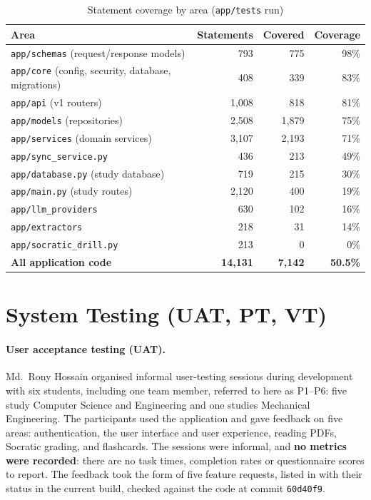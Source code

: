 \begin{table}[!htbp]
\centering
\caption{Statement coverage by area (\texttt{app/tests} run)}\label{tab:coverage}
\small
\begin{tabularx}{\textwidth}{@{}X r r r@{}}
\toprule
\textbf{Area} & \textbf{Statements} & \textbf{Covered} & \textbf{Coverage}\\
\midrule
\texttt{app/schemas} (request/response models) & 793 & 775 & 98\%\\
\texttt{app/core} (config, security, database, migrations) & 408 & 339 & 83\%\\
\texttt{app/api} (v1 routers) & 1{,}008 & 818 & 81\%\\
\texttt{app/models} (repositories) & 2{,}508 & 1{,}879 & 75\%\\
\texttt{app/services} (domain services) & 3{,}107 & 2{,}193 & 71\%\\
\texttt{app/sync\_service.py} & 436 & 213 & 49\%\\
\texttt{app/database.py} (study database) & 719 & 215 & 30\%\\
\texttt{app/main.py} (study routes) & 2{,}120 & 400 & 19\%\\
\texttt{app/llm\_providers} & 630 & 102 & 16\%\\
\texttt{app/extractors} & 218 & 31 & 14\%\\
\texttt{app/socratic\_drill.py} & 213 & 0 & 0\%\\
\midrule
\textbf{All application code} & \textbf{14{,}131} & \textbf{7{,}142} & \textbf{50.5\%}\\
\bottomrule
\end{tabularx}
\end{table}

\section{System Testing (UAT, PT, VT)}\label{sec:uat}

\paragraph{User acceptance testing (UAT).} Md.\ Rony Hossain organised informal user-testing sessions during
development with six students, including one team member, referred to here as P1--P6: five study Computer Science
and Engineering and one studies Mechanical Engineering. The participants used the application and gave feedback on
five areas: authentication, the user interface and user experience, reading PDFs, Socratic grading, and flashcards.
The sessions were informal, and \textbf{no metrics were recorded}: there are no task times, completion rates or
questionnaire scores to report. The feedback took the form of five feature requests, listed in  with
their status in the current build, checked against the code at commit \texttt{60d40f9}.

